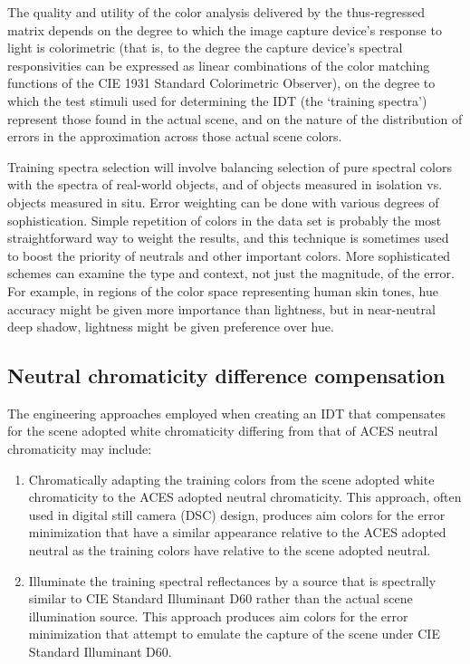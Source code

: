 The quality and utility of the color analysis delivered by the thus-regressed matrix depends on the degree to which the image capture device's response to light is colorimetric (that is, to the degree the capture device’s spectral responsivities can be expressed as linear combinations of the color matching functions of the CIE 1931 Standard Colorimetric Observer), on the degree to which the test stimuli used for determining the IDT (the `training spectra') represent those found in the actual scene, and on the nature of the distribution of errors in the approximation across those actual scene colors.

Training spectra selection will involve balancing selection of pure spectral colors with the spectra of real-world objects, and of objects measured in isolation vs. objects measured in situ. Error weighting can be done with various degrees of sophistication. Simple repetition of colors in the data set is probably the most straightforward way to weight the results, and this technique is sometimes used to boost the priority of neutrals and other important colors. More sophisticated schemes can examine the type and context, not just the magnitude, of the error. For example, in regions of the color space representing human skin tones, hue accuracy might be given more importance than lightness, but in near-neutral deep shadow, lightness might be given preference over hue.

\subsection{Neutral chromaticity difference compensation}
The engineering approaches employed when creating an IDT that compensates for the scene adopted white chromaticity differing from that of ACES neutral chromaticity may include:

\begin{enumerate}
	\item Chromatically adapting the training colors from the scene adopted white chromaticity to the ACES adopted neutral chromaticity. This approach, often used in digital still camera (DSC) design, produces aim colors for the error minimization that have a similar appearance relative to the ACES adopted neutral as the training colors have relative to the scene adopted neutral.
	\item Illuminate the training spectral reflectances by a source that is spectrally similar to CIE Standard Illuminant D60 rather than the actual scene illumination source. This approach produces aim colors for the error minimization that attempt to emulate the capture of the scene under CIE Standard Illuminant D60.
\end{enumerate}

